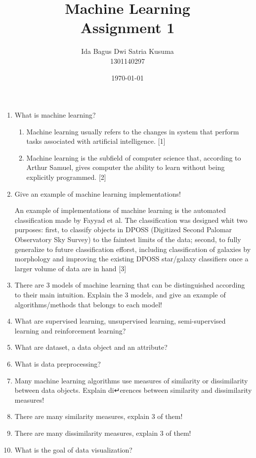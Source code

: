 \documentclass[12pt]{article}%
\begin{document}
\title{Machine Learning \protect\\ Assignment 1}
\author{Ida Bagus Dwi Satria Kusuma \protect\\ 1301140297}
\date{\today}
\maketitle

\begin{enumerate}
	\item What is machine learning? 
	\begin{enumerate}
		\item Machine learning usually refers to the changes in system that perform tasks associated with artificial intelligence. [1]
		\item Machine learning is the subfield of computer science that, according to Arthur Samuel, gives computer the ability to learn without being explicitly programmed. [2]
	\end{enumerate}

	\item Give an example of machine learning implementations!
	\par An example of implementations of machine learning is the automated classification made by Fayyad et al. The classification was designed whit two purposes: first, to classify objects in DPOSS (Digitized Second Palomar Observatory Sky Survey) to the faintest limits of the data; second, to fully generalize to future classification efforst, including classification of galaxies by morphology and improving the existing DPOSS star/galaxy classifiers once a larger volume of data are in hand [3]

	\item There are 3 models of machine learning that can be distinguished according to their main intuition. Explain the 3 models, and give an example of algorithms/methods that belongs to each model!

	\item What are supervised learning, unsupervised learning, semi-supervised learning and reinforcement learning?

	\item What are dataset, a data object and an attribute?

	\item What is data preprocessing?

	\item Many machine learning algorithms use measures of similarity or dissimilarity between data objects. Explain di↵erences between similarity and dissimilarity measures!

	\item There are many similarity measures, explain 3 of them!

	\item There are many dissimilarity measures, explain 3 of them!

	\item What is the goal of data visualization?
\end{enumerate}
\end{document}
